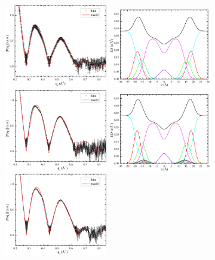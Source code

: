 \begin{figure}[htbp]
  \centering
  \includegraphics[width=0.4\textwidth]{figures/Tat/SDP_Results/XFF/DOPCDOPE3to1_XFF1}
  \includegraphics[width=0.4\textwidth]{./figures/Tat/SDP_Results/EDP/DOPCDOPE3to1_EDP1}
  \includegraphics[width=0.4\textwidth]{figures/Tat/SDP_Results/XFF/DOPCDOPE3to1_Tat_62to1_3p0_XFF1}
  \includegraphics[width=0.4\textwidth]{./figures/Tat/SDP_Results/EDP/DOPCDOPE3to1_Tat_62to1_3p0_EDP1}
  \includegraphics[width=0.4\textwidth]{figures/Tat/SDP_Results/XFF/DOPCDOPE3to1_Tat_28to1_3p0_XFF1}

\end{figure}
